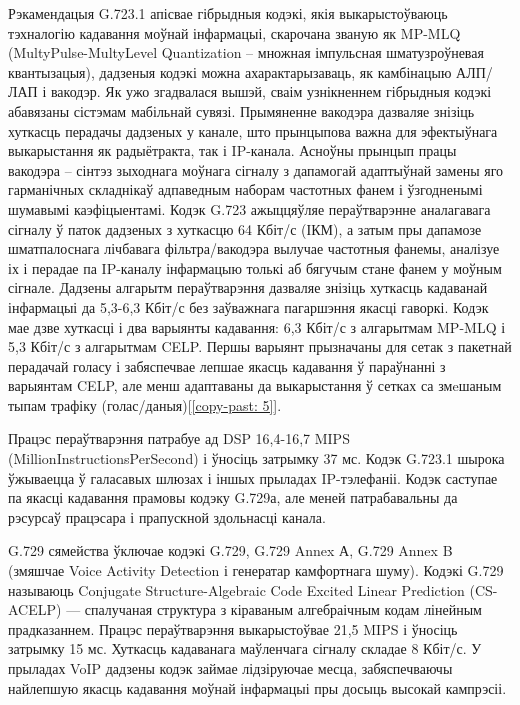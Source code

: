 Рэкамендацыя G.723.1 апісвае гібрыдныя кодэкі, якія выкарыстоўваюць тэхналогію кадавання моўнай інфармацыі, скарочана званую як MP-MLQ (MultyPulse-MultyLevel Quan\-ti\-za\-tion -- множная імпульсная шматузроўневая квантызацыя), дадзеныя кодэкі можна ахарактарызаваць, як камбінацыю АЛП/ЛАП і вакодэр. Як ужо згадвалася вышэй, сваім узнікненнем гібрыдныя кодэкі абавязаны сістэмам мабільнай сувязі. Прымяненне вакодэра дазваляе знізіць хуткасць перадачы дадзеных у канале, што прынцыпова важна для эфектыўнага выкарыстання як радыётракта, так і IP-канала. Асноўны прынцып працы вакодэра -- сінтэз зыходнага моўнага сігналу з дапамогай адаптыўнай замены яго гарманічных складнікаў адпаведным наборам частотных фанем і ўзгодненымі шумавымі каэфіцыентамі. Кодэк G.723 ажыццяўляе пераўтварэнне аналагавага сігналу ў паток дадзеных з хуткасцю 64 Кбіт/с (ІКМ), а затым пры дапамозе шматпалоснага лічбавага фільтра/вакодэра вылучае частотныя фанемы, аналізуе іх і перадае па IP-каналу інфармацыю толькі аб бягучым стане фанем у моўным сігнале. Дадзены алгарытм пераўтварэння дазваляе знізіць хуткасць кадаванай інфармацыі да 5,3-6,3 Кбіт/с без заўважнага пагаршэння якасці гаворкі. Кодэк мае дзве хуткасці і два варыянты кадавання: 6,3 Кбіт/с з алгарытмам MP-MLQ і 5,3 Кбіт/с з алгарытмам CELP. Першы варыянт прызначаны для сетак з пакетнай перадачай голасу і забяспечвае лепшае якасць кадавання ў параўнанні з варыянтам CELP, але менш адаптаваны да выкарыстання ў сетках са змeшаным тыпам трафіку (голас/даныя)[\ref{copy-past: 5}].

Працэс пераўтварэння патрабуе ад DSP 16,4-16,7 MIPS (MillionInstructionsPerSecond) і ўносіць затрымку 37 мс. Кодэк G.723.1 шырока ўжываецца ў галасавых шлюзах і іншых прыладах IP-тэлефаніі. Кодэк саступае па якасці кадавання прамовы кодэку G.729а, але меней патрабавальны да рэсурсаў працэсара і прапускной здольнасці канала.

G.729 сямейства ўключае кодэкі G.729, G.729 Annex А, G.729 Annex B (змяшчае Voice Activity Detection і генератар камфортнага шуму). Кодэкі G.729 называюць Conjugate Structure-Algebraic Code Excited Linear Prediction (CS-ACELP) --- спалучаная структура з кіраваным алгебраічным кодам лінейным прадказаннем. Працэс пераўтварэння выкарыстоўвае 21,5 MIPS і ўносіць затрымку 15 мс. Хуткасць кадаванага маўленчага сігналу складае 8 Кбіт/с. У прыладах VoIP дадзены кодэк займае лідзіруючае месца, забяспечваючы найлепшую якасць кадавання моўнай інфармацыі пры досыць высокай кампрэсіі.

